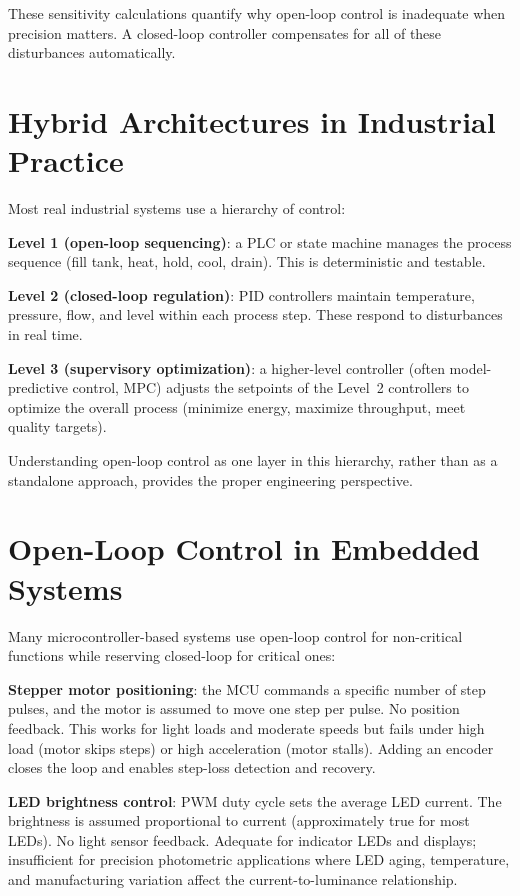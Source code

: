\documentclass[11pt,letterpaper,twoside,openany]{book}
\begin{document}
These sensitivity calculations quantify why open-loop control is inadequate when precision matters. A closed-loop controller compensates for all of these disturbances automatically.

\section{Hybrid Architectures in Industrial Practice}
Most real industrial systems use a hierarchy of control:

\textbf{Level 1 (open-loop sequencing)}: a PLC or state machine manages the process sequence (fill tank, heat, hold, cool, drain). This is deterministic and testable.

\textbf{Level 2 (closed-loop regulation)}: PID controllers maintain temperature, pressure, flow, and level within each process step. These respond to disturbances in real time.

\textbf{Level 3 (supervisory optimization)}: a higher-level controller (often model-predictive control, MPC) adjusts the setpoints of the Level~2 controllers to optimize the overall process (minimize energy, maximize throughput, meet quality targets).

Understanding open-loop control as one layer in this hierarchy, rather than as a standalone approach, provides the proper engineering perspective.
\section{Open-Loop Control in Embedded Systems}
Many microcontroller-based systems use open-loop control for non-critical functions while reserving closed-loop for critical ones:

\textbf{Stepper motor positioning}: the MCU commands a specific number of step pulses, and the motor is assumed to move one step per pulse. No position feedback. This works for light loads and moderate speeds but fails under high load (motor skips steps) or high acceleration (motor stalls). Adding an encoder closes the loop and enables step-loss detection and recovery.

\textbf{LED brightness control}: PWM duty cycle sets the average LED current. The brightness is assumed proportional to current (approximately true for most LEDs). No light sensor feedback. Adequate for indicator LEDs and displays; insufficient for precision photometric applications where LED aging, temperature, and manufacturing variation affect the current-to-luminance relationship.
\end{document}
